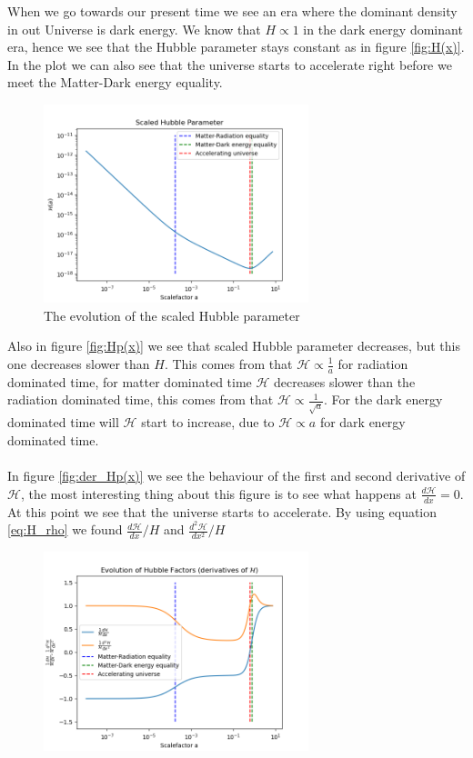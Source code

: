 \documentclass{article}
\begin{document}
\begin{multicols}{2}
When we go towards our present time we see an era where the dominant density in out Universe is dark energy. We know that $H\propto 1$ in the dark energy dominant era, hence we see that the Hubble parameter stays constant as in figure \eqref{fig:H(x)}. In the plot we can also see that the universe starts to accelerate  right before we meet the Matter-Dark energy equality. 
\begin{figure}[H]
	\centering
	\includegraphics[width=77mm]{Scaled Hubble Parameter.png}
	\caption{The evolution of the scaled Hubble parameter}
	\label{fig:Hp(x)}
\end{figure}
Also in figure \eqref{fig:Hp(x)} we see that scaled Hubble parameter decreases, but this one decreases slower than $H$. This comes from that $\mathcal{H}\propto \frac{1}{a}$ for radiation dominated time, for matter dominated time $\mathcal{H}$ decreases slower than the  radiation dominated time, this comes from that $\mathcal{H}\propto \frac{1}{\sqrt{a}}$. For the dark energy dominated time will $\mathcal{H}$ start to increase, due to $\mathcal{H}\propto {a}$ for dark energy dominated time. \\
\\
In figure \eqref{fig:der_Hp(x)} we see the behaviour of the first and second derivative of $\mathcal{H}$, the most interesting thing about this figure is to see what happens at $\frac{d\mathcal{H}}{dx}=0$. At this point we see that the universe starts to accelerate. By using equation \eqref{eq:H_rho} we found $\frac{d\mathcal{H}}{dx}/H$ and $\frac{d^2\mathcal{H}}{dx^2}/H$
\begin{figure}[H]
	\centering
	\includegraphics[width=77mm]{der_Hp.png}

\end{figure}
\end{multicols}
\end{document}
